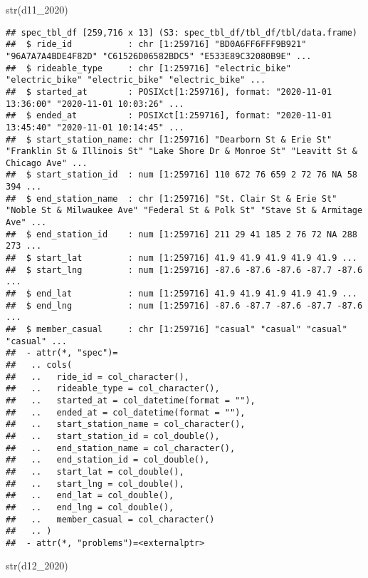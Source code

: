 \documentclass[
]{article}
\newenvironment{Shaded}{\begin{snugshade}}{\end{snugshade}}
\newcommand{\FunctionTok}[1]{\textcolor[rgb]{0.00,0.00,0.00}{#1}}
\newcommand{\NormalTok}[1]{#1}
\begin{document}
\begin{Shaded}
\begin{Highlighting}[]
\FunctionTok{str}\NormalTok{(d11\_2020)}
\end{Highlighting}
\end{Shaded}

\begin{verbatim}
## spec_tbl_df [259,716 x 13] (S3: spec_tbl_df/tbl_df/tbl/data.frame)
##  $ ride_id           : chr [1:259716] "BD0A6FF6FFF9B921" "96A7A7A4BDE4F82D" "C61526D06582BDC5" "E533E89C32080B9E" ...
##  $ rideable_type     : chr [1:259716] "electric_bike" "electric_bike" "electric_bike" "electric_bike" ...
##  $ started_at        : POSIXct[1:259716], format: "2020-11-01 13:36:00" "2020-11-01 10:03:26" ...
##  $ ended_at          : POSIXct[1:259716], format: "2020-11-01 13:45:40" "2020-11-01 10:14:45" ...
##  $ start_station_name: chr [1:259716] "Dearborn St & Erie St" "Franklin St & Illinois St" "Lake Shore Dr & Monroe St" "Leavitt St & Chicago Ave" ...
##  $ start_station_id  : num [1:259716] 110 672 76 659 2 72 76 NA 58 394 ...
##  $ end_station_name  : chr [1:259716] "St. Clair St & Erie St" "Noble St & Milwaukee Ave" "Federal St & Polk St" "Stave St & Armitage Ave" ...
##  $ end_station_id    : num [1:259716] 211 29 41 185 2 76 72 NA 288 273 ...
##  $ start_lat         : num [1:259716] 41.9 41.9 41.9 41.9 41.9 ...
##  $ start_lng         : num [1:259716] -87.6 -87.6 -87.6 -87.7 -87.6 ...
##  $ end_lat           : num [1:259716] 41.9 41.9 41.9 41.9 41.9 ...
##  $ end_lng           : num [1:259716] -87.6 -87.7 -87.6 -87.7 -87.6 ...
##  $ member_casual     : chr [1:259716] "casual" "casual" "casual" "casual" ...
##  - attr(*, "spec")=
##   .. cols(
##   ..   ride_id = col_character(),
##   ..   rideable_type = col_character(),
##   ..   started_at = col_datetime(format = ""),
##   ..   ended_at = col_datetime(format = ""),
##   ..   start_station_name = col_character(),
##   ..   start_station_id = col_double(),
##   ..   end_station_name = col_character(),
##   ..   end_station_id = col_double(),
##   ..   start_lat = col_double(),
##   ..   start_lng = col_double(),
##   ..   end_lat = col_double(),
##   ..   end_lng = col_double(),
##   ..   member_casual = col_character()
##   .. )
##  - attr(*, "problems")=<externalptr>
\end{verbatim}

\begin{Shaded}
\begin{Highlighting}[]
\FunctionTok{str}\NormalTok{(d12\_2020)}
\end{Highlighting}
\end{Shaded}
\end{document}

